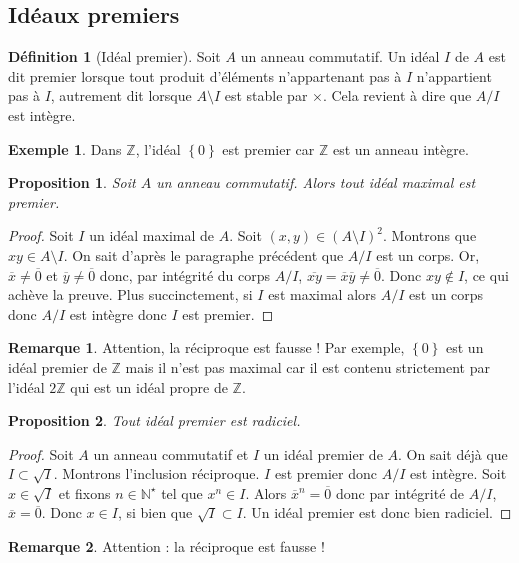 \documentclass[french]{book}
\newcommand{\N}{\mathbb{N}}
\newcommand{\Z}{\mathbb{Z}}
\newcommand{\st}{^\star}
\theoremstyle{plain}
\newtheorem{prop}{Proposition}[chapter]
\theoremstyle{definition}
\newtheorem{dfn}{Définition}[chapter]
\newtheorem{exa}{Exemple}[chapter]
\newtheorem{rmq}{Remarque}[chapter]
\theoremstyle{remark}
\begin{document}
\subsection{Idéaux premiers}
\begin{dfn}[Idéal premier]
	Soit $A$ un anneau commutatif. Un idéal $I$ de $A$ est dit premier lorsque tout produit d'éléments n'appartenant pas à $I$ n'appartient pas à $I$, autrement dit lorsque $A\setminus I$ est stable par $\times$. Cela revient à dire que $A/I$ est intègre.
\end{dfn}
\begin{exa}
	Dans $\Z$, l'idéal $\left\{0\right\}$ est premier car $\Z$ est un anneau intègre.
\end{exa}
\begin{prop}
	Soit $A$ un anneau commutatif. Alors tout idéal maximal est premier.
\end{prop}
\begin{proof}
	Soit $I$ un idéal maximal de $A$. Soit $(x,y)\in(A\setminus I)^2$. Montrons que $xy\in A\setminus I$. On sait d'après le paragraphe précédent que $A/I$ est un corps. Or, $\overline{x}\ne\overline{0}$ et $\overline{y}\ne\overline{0}$ donc, par intégrité du corps $A/I$, $\overline{xy}=\overline{x}\overline{y}\ne\overline{0}$. Donc $xy\notin I$, ce qui achève la preuve. Plus succinctement, si $I$ est maximal alors $A/I$ est un corps donc $A/I$ est intègre donc $I$ est premier.
\end{proof}
\begin{rmq}
	Attention, la réciproque est fausse ! Par exemple, $\left\{0\right\}$ est un idéal premier de $\Z$ mais il n'est pas maximal car il est contenu strictement par l'idéal $2\Z$ qui est un idéal propre de $\Z$.
\end{rmq}
\begin{prop}
	Tout idéal premier est radiciel.
\end{prop}
\begin{proof}
	Soit $A$ un anneau commutatif et $I$ un idéal premier de $A$. On sait déjà que $I\subset\sqrt{I}$. Montrons l'inclusion réciproque. $I$ est premier donc $A/I$ est intègre. Soit $x\in\sqrt{I}$ et fixons $n\in\N\st$ tel que $x^n\in I$. Alors $\overline{x}^n=\overline{0}$ donc par intégrité de $A/I$, $\overline{x}=\overline{0}$. Donc $x\in I$, si bien que $\sqrt{I}\subset I$. Un idéal premier est donc bien radiciel.
\end{proof}
\begin{rmq}
	Attention : la réciproque est fausse !
\end{rmq}
\end{document}
